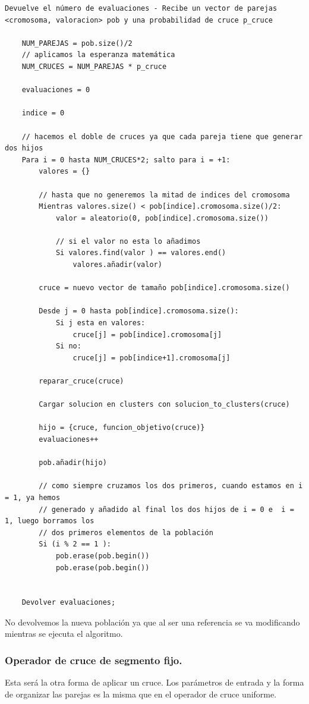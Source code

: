 \documentclass[12pt, spanish]{article}
\begin{document}
\begin{lstlisting}
Devuelve el número de evaluaciones - Recibe un vector de parejas <cromosoma, valoracion> pob y una probabilidad de cruce p_cruce

	NUM_PAREJAS = pob.size()/2
	// aplicamos la esperanza matemática
	NUM_CRUCES = NUM_PAREJAS * p_cruce
	
	evaluaciones = 0
	
	indice = 0
	
	// hacemos el doble de cruces ya que cada pareja tiene que generar dos hijos
	Para i = 0 hasta NUM_CRUCES*2; salto para i = +1:
		valores = {}

		// hasta que no generemos la mitad de indices del cromosoma		
		Mientras valores.size() < pob[indice].cromosoma.size()/2:
			valor = aleatorio(0, pob[indice].cromosoma.size())
			
			// si el valor no esta lo añadimos
			Si valores.find(valor ) == valores.end() 
				valores.añadir(valor)
				
		cruce = nuevo vector de tamaño pob[indice].cromosoma.size()
		
		Desde j = 0 hasta pob[indice].cromosoma.size():
			Si j esta en valores:
				cruce[j] = pob[indice].cromosoma[j]
			Si no:
				cruce[j] = pob[indice+1].cromosoma[j]
				
		reparar_cruce(cruce)
		
		Cargar solucion en clusters con solucion_to_clusters(cruce)
		
		hijo = {cruce, funcion_objetivo(cruce)}
		evaluaciones++
		
		pob.añadir(hijo)
		
		// como siempre cruzamos los dos primeros, cuando estamos en i = 1, ya hemos
		// generado y añadido al final los dos hijos de i = 0 e  i = 1, luego borramos los
		// dos primeros elementos de la población
		Si (i % 2 == 1 ):
			pob.erase(pob.begin())
			pob.erase(pob.begin())
					

	Devolver evaluaciones;

\end{lstlisting}

No devolvemos la nueva población ya que al ser una referencia se va modificando mientras se ejecuta el algoritmo.

\subsubsection{Operador de cruce de segmento fijo.}

Esta será la otra forma de aplicar un cruce. Los parámetros de entrada y la forma de organizar las parejas es la misma que en el operador de cruce uniforme.
\end{document}
